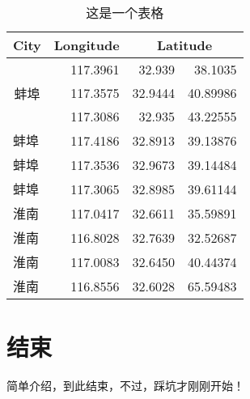 \documentclass[UTF8]{ctexart}
\begin{document}
\begin{table}[htbp]
	\centering
	\caption{这是一个表格} %
	\begin{tabular}{lrrr}
		\toprule
		City  & \multicolumn{1}{l}{Longitude} & \multicolumn{2}{c}{Latitude} \\
		\midrule
		\multicolumn{1}{c}{\multirow{3}[6]{*}{蚌埠}} & 117.3961 & 32.939 & 38.1035 \\
		\cmidrule{2-4}          & 117.3575 & 32.9444 & 40.89986 \\
		\cmidrule{2-4}          & 117.3086 & 32.935 & 43.22555 \\
		\midrule
		蚌埠    & 117.4186 & 32.8913 & 39.13876 \\
		\midrule
		蚌埠    & 117.3536 & 32.9673 & 39.14484 \\
		\midrule
		蚌埠    & 117.3065 & 32.8985 & 39.61144 \\
		\midrule
		淮南    & 117.0417 & 32.6611 & 35.59891 \\
		\midrule
		淮南    & 116.8028 & 32.7639 & 32.52687 \\
		\midrule
		淮南    & 117.0083 & 32.6450 & 40.44374 \\
		\midrule
		淮南    & 116.8556 & 32.6028 & 65.59483 \\
		\bottomrule
	\end{tabular}%
	\label{tab:li}%
\end{table}%


\section{结束}

简单介绍，到此结束，不过，踩坑才刚刚开始！
\end{document}
